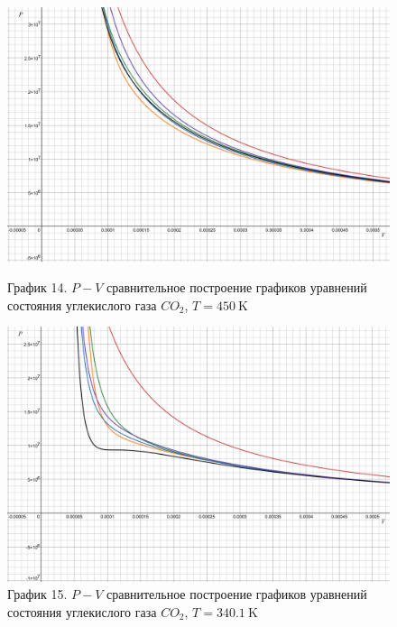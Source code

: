 \documentclass[a4paper]{article}
\numberwithin{equation}{subsection} %
\begin{document}
\begin{figure}[h!]
    \centering
    \begin{minipage}{0.49\textwidth}
        \centering
        \includegraphics[width=\linewidth]{Graphics/CO2/450.png}
        \caption{\label{fig:clausius_1}График 14. $P-V$ сравнительное построение графиков уравнений состояния углекислого газа $CO_2$, $T = 450 \ \text{K}$}
    \end{minipage}
    \hfill
    \begin{minipage}{0.49\textwidth}
        \centering
        \includegraphics[width=\linewidth]{Graphics/CO2/340_1.png}
        \caption{\label{fig:clausius_1}График 15. $P-V$ сравнительное построение графиков уравнений состояния углекислого газа $CO_2$, $T = 340.1 \ \text{K}$}
    \end{minipage}
\end{figure}
\end{document}
